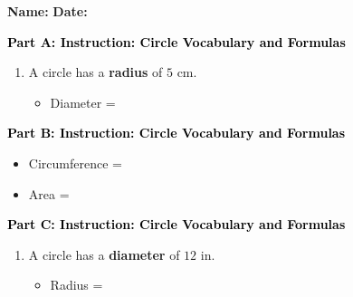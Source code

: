 \documentclass[12pt, letterpaper, fleqn]{article}
\newcommand{\blank}{\underline{\hspace{2.2cm}}}
\begin{document}
\textbf{Name:} \underline{\hspace{5cm}}
\hfill
\textbf{Date:} \underline{\hspace{3cm}}\\

\begin{tcolorbox}[colback=customteal!20]
\large\textcolor{black}{\textbf{Part A: Instruction: Circle Vocabulary and Formulas}}
\end{tcolorbox}

\vspace{3mm}

\begin{enumerate}[itemsep=2.2cm, leftmargin=0.6cm]
\item A circle has a \textbf{radius} of $5\text{ cm}$.
\begin{itemize}
\item Diameter = \blank
\end{itemize}
\end{enumerate}

\newpage

\begin{tcolorbox}[colback=customteal!20]
\large\textcolor{black}{\textbf{Part B: Instruction: Circle Vocabulary and Formulas}}
\end{tcolorbox}

\vspace{3mm}

\begin{enumerate}[itemsep=2.2cm, leftmargin=0.6cm, resume]
\begin{itemize}
\item Circumference = \blank
\item Area = \blank
\end{itemize}
\end{enumerate}

\newpage

\begin{tcolorbox}[colback=customteal!20]
\large\textcolor{black}{\textbf{Part C: Instruction: Circle Vocabulary and Formulas}}
\end{tcolorbox}

\vspace{3mm}

\begin{enumerate}[itemsep=2.2cm, leftmargin=0.6cm, resume]
\item A circle has a \textbf{diameter} of $12\text{ in}$.
\begin{itemize}
\item Radius = \blank
\end{itemize}
\end{enumerate}
\end{document}
